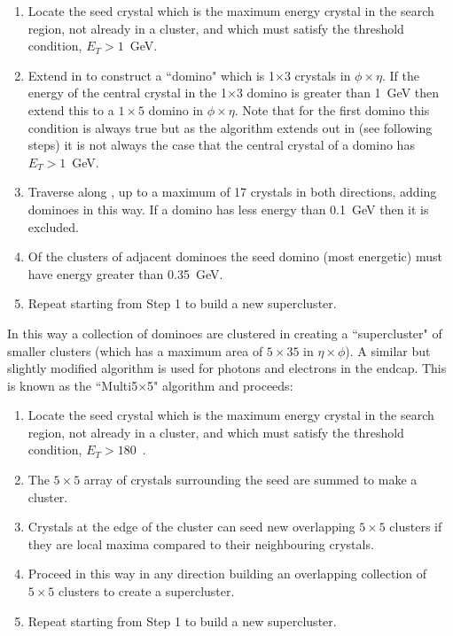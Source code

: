 \begin{enumerate}
  \item{Locate the seed crystal which is the maximum energy crystal in the search region, not already in a cluster, and which must satisfy the threshold condition, $E_{T}>1$~GeV.}
  \item{Extend in \eta to construct a ``domino" which is 1$\times$3 crystals in $\phi\times\eta$. If the energy of the central crystal in the 1$\times$3 domino is greater than 1~GeV then extend this to a $1\times5$ domino in $\phi\times\eta$. Note that for the first domino this condition is always true but as the algorithm extends out in \phi (see following steps) it is not always the case that the central crystal of a domino has $E_{T}>1$~GeV.}
  \item{Traverse along \phi, up to a maximum of 17 crystals in both directions, adding dominoes in this way. If a domino has less energy than 0.1~GeV then it is excluded.}
  \item{Of the clusters of adjacent dominoes the seed domino (most energetic) must have energy greater than 0.35~GeV.}
  \item{Repeat starting from Step 1 to build a new supercluster.}
\end{enumerate}
In this way a collection of dominoes are clustered in \phi creating a ``supercluster" of smaller clusters (which has a maximum area of $5\times35$ in $\eta\times\phi$). A similar but slightly modified algorithm is used for photons and electrons in the endcap. This is known as the ``Multi5$\times$5" algorithm and proceeds:

\begin{enumerate}
  \item{Locate the seed crystal which is the maximum energy crystal in the search region, not already in a cluster, and which must satisfy the threshold condition, $E_{T}>180$~\MeV.}
  \item{The $5\times5$ array of crystals surrounding the seed are summed to make a cluster.}
  \item{Crystals at the edge of the cluster can seed new overlapping $5\times5$ clusters if they are local maxima compared to their neighbouring crystals.}
  \item{Proceed in this way in any direction building an overlapping collection of $5\times5$ clusters to create a supercluster.}
  \item{Repeat starting from Step 1 to build a new supercluster.}
\end{enumerate}


